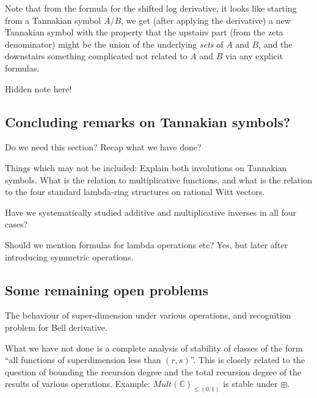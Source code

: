 \documentclass[a4paper]{article}
\theoremstyle{definition}
\theoremstyle{remark}
\newcommand{\C}{\mathbb{C}}
\begin{document}
Note that from the formula for the shifted log derivative, it looks like starting from a Tannakian symbol $A/B$, we get (after applying the derivative) a new Tannakian symbol with the property that the upstairs part (from the zeta denominator) might be the union of the underlying \emph{sets} of $A$ and $B$, and the downstairs something complicated not related to $A$ and $B$ via any explicit formulas. 


Hidden note here!





\subsection{Concluding remarks on Tannakian symbols?}

Do we need this section? Recap what we have done?

Things which may not be included: Explain both involutions on Tannakian symbols. What is the relation to multiplicative functions, and what is the relation to the four standard lambda-ring structures on rational Witt vectors.

Have we systematically studied additive and multiplicative inverses in all four cases?

Should we mention formulas for lambda operations etc? Yes, but later after introducing symmetric operations.


\subsection{Some remaining open problems}

The behaviour of super-dimension under various operations, and recognition problem for Bell derivative.

What we have not done is a complete analysis of stability of classes of the form ``all functions of superdimension less than $(r, s)$''. This is closely related to the question of bounding the recursion degree and the total recursion degree of the results of various operations. Example: $Mult(\C)_{\leq (0, 1)}$ is stable under $\boxplus$.
\end{document}
